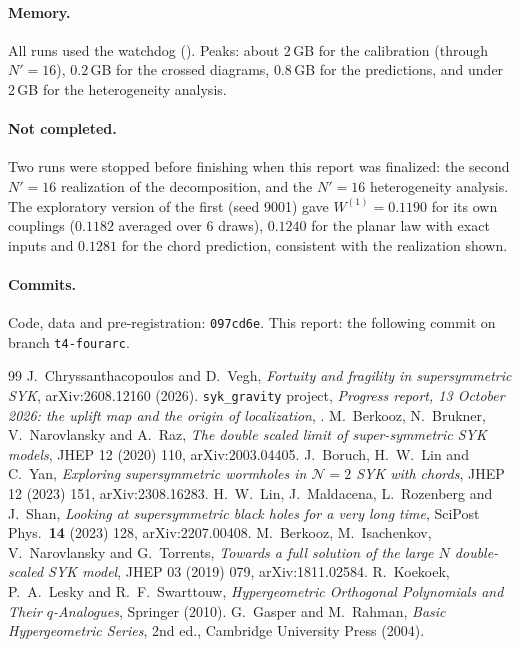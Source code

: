 \documentclass[11pt]{article}
\newcommand{\Np}{N'}
\newcommand{\Wone}{W^{(1)}}
\theoremstyle{plain}
\theoremstyle{remark}
\numberwithin{equation}{section}
\begin{document}
\paragraph{Memory.} All runs used the watchdog (). Peaks: about $2$\,GB for the calibration
(through $\Np=16$), $0.2$\,GB for the crossed diagrams, $0.8$\,GB for the predictions, and under $2$\,GB for the
heterogeneity analysis.

\paragraph{Not completed.} Two runs were stopped before finishing when this report was finalized: the second $\Np=16$
realization of the decomposition, and the $\Np=16$ heterogeneity analysis. The exploratory version of the first (seed 9001) gave
$\Wone=0.1190$ for its own couplings ($0.1182$ averaged over $6$ draws), $0.1240$ for the planar law with exact inputs
and $0.1281$ for the chord prediction, consistent with the realization shown.

\paragraph{Commits.} Code, data and pre-registration: \texttt{097cd6e}. This report: the following commit on branch
\texttt{t4-fourarc}.

\begin{thebibliography}{99}\small
{} J.~Chryssanthacopoulos and D.~Vegh, \emph{Fortuity and fragility in supersymmetric SYK}, arXiv:2608.12160 (2026).
 \texttt{syk\_gravity} project, \emph{Progress report, 13 October 2026: the uplift map and the origin of localization}, .
 M.~Berkooz, N.~Brukner, V.~Narovlansky and A.~Raz, \emph{The double scaled limit of super-symmetric SYK models}, JHEP 12 (2020) 110, arXiv:2003.04405.
 J.~Boruch, H.~W.~Lin and C.~Yan, \emph{Exploring supersymmetric wormholes in $\mathcal N=2$ SYK with chords}, JHEP 12 (2023) 151, arXiv:2308.16283.
 H.~W.~Lin, J.~Maldacena, L.~Rozenberg and J.~Shan, \emph{Looking at supersymmetric black holes for a very long time}, SciPost Phys.\ \textbf{14} (2023) 128, arXiv:2207.00408.
 M.~Berkooz, M.~Isachenkov, V.~Narovlansky and G.~Torrents, \emph{Towards a full solution of the large $N$ double-scaled SYK model}, JHEP 03 (2019) 079, arXiv:1811.02584.
 R.~Koekoek, P.~A.~Lesky and R.~F.~Swarttouw, \emph{Hypergeometric Orthogonal Polynomials and Their $q$-Analogues}, Springer (2010).
 G.~Gasper and M.~Rahman, \emph{Basic Hypergeometric Series}, 2nd ed., Cambridge University Press (2004).
\end{thebibliography}
\end{document}
